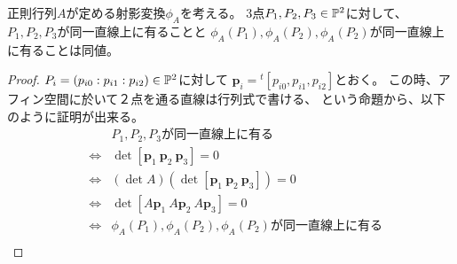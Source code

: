 \documentclass[a4paper]{jsarticle}
\begin{document}
\begin{Lemma}
    正則行列$A$が定める射影変換$\phi_A$を考える。
    3点$P_1, P_2, P_3 \in \mathbb{P}^2$に対して、
    $P_1, P_2, P_3$が同一直線上に有ることと
    $\phi_A(P_1), \phi_A(P_2), \phi_A(P_2)$が同一直線上に有ることは同値。
\end{Lemma}
\begin{proof}
    $P_i=(p_{i0}:p_{i1}:p_{i2}) \in \mathbb{P}^2$に対して
    $\mathbf{p}_i={}^t[ p_{i0}, p_{i1}, p_{i2} ]$とおく。
    この時、アフィン空間に於いて２点を通る直線は行列式で書ける、
    という命題から、以下のように証明が出来る。
    \begin{eqnarray*}
        &{}&    \mbox{$P_1, P_2, P_3$が同一直線上に有る} \\
        &\iff&  \det[\mathbf{p}_1~\mathbf{p}_2~\mathbf{p}_3]=0 \\
        &\iff&  (\det A) (\det[\mathbf{p}_1~\mathbf{p}_2~\mathbf{p}_3])=0 \\
        &\iff&  \det[A\mathbf{p}_1~A\mathbf{p}_2~A\mathbf{p}_3]=0 \\
        &\iff&  \mbox{$\phi_A(P_1), \phi_A(P_2), \phi_A(P_2)$が同一直線上に有る} \\
    \end{eqnarray*}
    
\end{proof}
\end{document}
